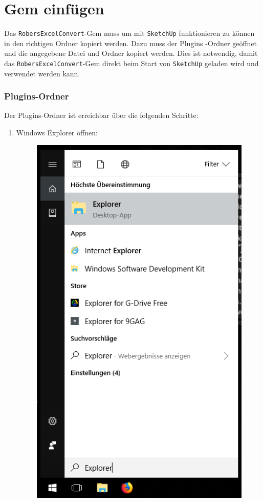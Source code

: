 \documentclass{book}
\newcommand{\sketchup}{\texttt{SketchUp}\xspace}
\newcommand{\robersexcelconvert}{\texttt{RobersExcelConvert}\xspace}
\begin{document}
		\section{Gem einfügen}
			Das \robersexcelconvert-Gem muss um mit \sketchup funktionieren zu können in den richtigen Ordner kopiert werden. 
			Dazu muss der \glqq Plugins \grqq-Ordner geöffnet und die angegebene Datei und Ordner kopiert werden.
			Dies ist notwendig, damit das \robersexcelconvert-Gem direkt beim Start von \sketchup geladen wird und verwendet werden kann.
			\subsubsection{Plugins-Ordner}
				Der Plugins-Ordner ist erreichbar über die folgenden Schritte:
				\begin{enumerate}
					\item Windows Explorer öffnen:\\
						\begin{figure}[H]
							\centering
							\includegraphics[scale=0.5]{pics/plugins-ordner/Explorer-oeffnen.png}

\end{figure}
\end{enumerate}
\end{document}
